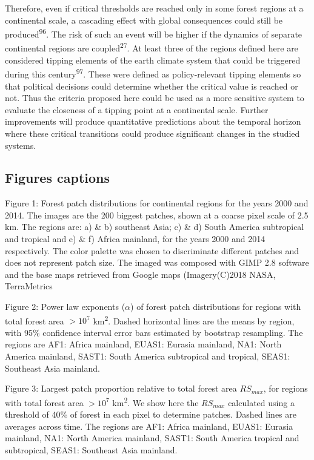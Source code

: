 \documentclass[]{article}
\begin{document}
Therefore, even if critical thresholds are reached only in some forest
regions at a continental scale, a cascading effect with global
consequences could still be produced\textsuperscript{96}. The risk of
such an event will be higher if the dynamics of separate continental
regions are coupled\textsuperscript{27}. At least three of the regions
defined here are considered tipping elements of the earth climate system
that could be triggered during this century\textsuperscript{97}. These
were defined as policy-relevant tipping elements so that political
decisions could determine whether the critical value is reached or not.
Thus the criteria proposed here could be used as a more sensitive system
to evaluate the closeness of a tipping point at a continental scale.
Further improvements will produce quantitative predictions about the
temporal horizon where these critical transitions could produce
significant changes in the studied systems.

\subsection{Figures captions}\label{figures-captions}

Figure 1: Forest patch distributions for continental regions for the
years 2000 and 2014. The images are the 200 biggest patches, shown at a
coarse pixel scale of 2.5 km. The regions are: a) \& b) southeast Asia;
c) \& d) South America subtropical and tropical and e) \& f) Africa
mainland, for the years 2000 and 2014 respectively. The color palette
was chosen to discriminate different patches and does not represent
patch size. The imaged was composed with GIMP 2.8 software and the base
maps retrieved from Google maps (Imagery(C)2018 NASA, TerraMetrics

Figure 2: Power law exponents (\(\alpha\)) of forest patch distributions
for regions with total forest area \(> 10^{7}\) \si{km^2}. Dashed
horizontal lines are the means by region, with 95\% confidence interval
error bars estimated by bootstrap resampling. The regions are AF1:
Africa mainland, EUAS1: Eurasia mainland, NA1: North America mainland,
SAST1: South America subtropical and tropical, SEAS1: Southeast Asia
mainland.

Figure 3: Largest patch proportion relative to total forest area
\(RS_{max}\), for regions with total forest area \(>10^{7}\) \si{km^2}.
We show here the \(RS_{max}\) calculated using a threshold of 40\% of
forest in each pixel to determine patches. Dashed lines are averages
across time. The regions are AF1: Africa mainland, EUAS1: Eurasia
mainland, NA1: North America mainland, SAST1: South America tropical and
subtropical, SEAS1: Southeast Asia mainland.
\end{document}
